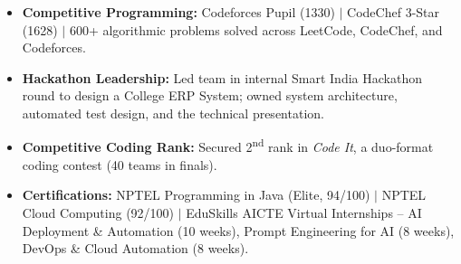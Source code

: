 \documentclass[letterpaper,10pt]{article}
\newcommand{\resumeItem}[1]{
\item{#1 \vspace{1pt}}
}
\begin{document}
\begin{itemize}[
leftmargin=0.18in,
itemsep=1pt,
topsep=0pt,
parsep=0pt,
partopsep=0pt
]

\resumeItem{\textbf{Competitive Programming:} Codeforces Pupil (1330) $|$ CodeChef 3-Star (1628) $|$ 600+ algorithmic problems solved across LeetCode, CodeChef, and Codeforces.}
\resumeItem{\textbf{Hackathon Leadership:} Led team in internal Smart India Hackathon round to design a College ERP System; owned system architecture, automated test design, and the technical presentation.}
\resumeItem{\textbf{Competitive Coding Rank:} Secured 2\textsuperscript{nd} rank in \textit{Code It}, a duo-format coding contest (40 teams in finals).}
\resumeItem{\textbf{Certifications:} NPTEL Programming in Java (Elite, 94/100) $|$ NPTEL Cloud Computing (92/100) $|$ EduSkills AICTE Virtual Internships -- AI Deployment \& Automation (10 weeks), Prompt Engineering for AI (8 weeks), DevOps \& Cloud Automation (8 weeks).}

\end{itemize}
\end{document}
